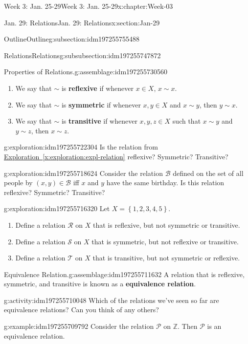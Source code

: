 \documentclass[oneside,10pt,]{book}
\newcommand{\xreffont}{\relax}
\newcommand{\terminology}[1]{\textbf{#1}}
\numberwithin{equation}{section}
\newcommand{\set}[1]{\left\{ {#1} \right\}}
\begin{document}
\begin{chapterptx}{Week 3: Jan. 25-29}{}{Week 3: Jan. 25-29}{}{}{x:chapter:Week-03}
\begin{sectionptx}{Jan. 29: Relations}{}{Jan. 29: Relations}{}{}{x:section:Jan-29}
\begin{subsectionptx}{Outline}{}{Outline}{}{}{g:subsection:idm197255755488}
\begin{subsubsectionptx}{Relations}{}{Relations}{}{}{g:subsubsection:idm197255747872}
\begin{assemblage}{Properties of Relations.}{g:assemblage:idm197255730560}
\begin{enumerate}
\item{}We say that \(\sim\) is \terminology{reflexive} if whenever \(x\in X\), \(x\sim x\).%
\item{}We say that \(\sim\) is \terminology{symmetric} if whenever \(x,y\in X\) and \(x\sim y\), then \(y\sim x\).%
\item{}We say that \(\sim\) is \terminology{transitive} if whenever \(x,y,z\in X\) such that \(x\sim y\) and \(y\sim z\), then \(x\sim z\).%
\end{enumerate}
%
\end{assemblage}
\begin{exploration}{}{g:exploration:idm197255722304}%
Is the relation from \hyperref[x:exploration:expl-relation]{Exploration~{\xreffont\ref{x:exploration:expl-relation}}} reflexive? Symmetric? Transitive?%
\end{exploration}%
\begin{exploration}{}{g:exploration:idm197255718624}%
Consider the relation \(\mathcal{B}\) defined on the set of all people by \((x,y)\in \mathcal{B}\) iff \(x\) and \(y\) have the same birthday. Is this relation reflexive? Symmetric? Transitive?%
\end{exploration}%
\begin{exploration}{}{g:exploration:idm197255716320}%
Let \(X = \set{1,2,3,4,5}\).%
%
\begin{enumerate}
\item{}Define a relation \(\mathcal{R}\) on \(X\) that is reflexive, but not symmetric or transitive.%
\item{}Define a relation \(\mathcal{S}\) on \(X\) that is symmetric, but not reflexive or transitive.%
\item{}Define a relation \(\mathcal{T}\) on \(X\) that is transitive, but not symmetric or reflexive.%
\end{enumerate}
\end{exploration}%
\begin{assemblage}{Equivalence Relation.}{g:assemblage:idm197255711632}%
A relation that is reflexive, symmetric, and transitive is known as a \terminology{equivalence relation}.%
\end{assemblage}
\begin{activity}{}{g:activity:idm197255710048}%
Which of the relations we've seen so far are equivalence relations? Can you think of any others?%
\end{activity}%
\begin{example}{}{g:example:idm197255709792}%
Consider the relation \(\mathcal{P}\) on \(\mathbb{Z}\). Then \(\mathcal{P}\) is an equivalence relation.%

\end{example}
\end{subsubsectionptx}
\end{subsectionptx}
\end{sectionptx}
\end{chapterptx}
\end{document}
